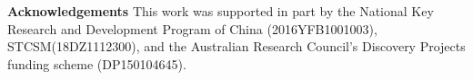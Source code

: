 \documentclass[10pt,twocolumn,letterpaper]{article}
\begin{document}
\noindent\textbf{Acknowledgements} This work was  supported in part by the National Key Research and Development Program of China (2016YFB1001003), STCSM(18DZ1112300), and the Australian Research Council's Discovery Projects funding
scheme (DP150104645).


{\small


}
\end{document}
